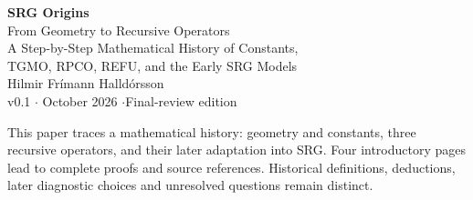 \documentclass[11pt,a4paper]{article}
\begin{document}
\begin{center}
{\color{ink}\LARGE\bfseries SRG Origins}\\[6pt]
{\Large From Geometry to Recursive Operators}\\[8pt]
{\small A Step-by-Step Mathematical History of Constants,\\
TGMO, RPCO, REFU, and the Early SRG Models}\\[10pt]
{\normalsize Hilmir Frímann Halldórsson}\\[3pt]
{\small v0.1 \enspace$\cdot$ October 2026 \enspace$\cdot$\enspace Final-review edition}
\end{center}
\vspace{3pt}
\noindent This paper traces a mathematical history: geometry and constants, three
recursive operators, and their later adaptation into SRG. Four introductory pages
lead to complete proofs and source references. Historical definitions, deductions,
later diagnostic choices and unresolved questions remain distinct.
\end{document}

